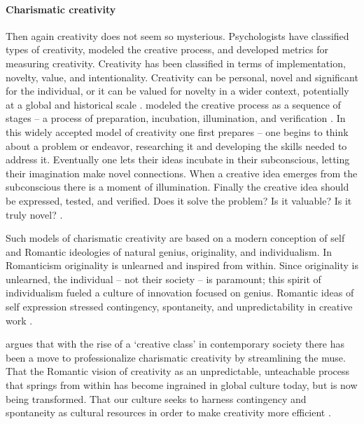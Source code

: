 \documentclass{article}
\begin{document}
\paragraph{Charismatic creativity}
Then again creativity does not seem so mysterious. %
%
Psychologists have classified types of creativity, modeled the creative process, 
and developed metrics for measuring creativity.
Creativity has been classified in terms of implementation, novelty, value, and intentionality. 
Creativity can be personal, novel and significant for the individual, or it can be valued for novelty in a wider context, potentially at a global and historical scale \citep{Drago2014}. 
%
\citeauthor{Wallas1926} modeled the creative process as a sequence of stages -- 
a process of preparation, incubation, illumination, and verification \citeyearpar{Wallas1926}. 
In this widely accepted model of creativity 
one first prepares -- 
one begins to think about a problem or endeavor, 
researching it and developing the skills needed to address it.
Eventually one lets their ideas incubate in their subconscious, 
letting their imagination make novel connections. 
When a creative idea emerges from the subconscious 
there is a moment of illumination.
Finally the creative idea should be expressed, tested, and verified.
Does it solve the problem? Is it valuable? Is it truly novel? \citep{Wallas1926, Drago2014}. 
%

Such models of charismatic creativity are based on a modern conception of self
and Romantic ideologies of natural genius, originality, and individualism. 
In Romanticism originality is unlearned and inspired from within. 
%
Since originality is unlearned, 
the individual -- not their society -- is paramount; 
this spirit of individualism 
fueled a culture of innovation focused on genius. 
%
Romantic ideas of self expression stressed 
contingency, spontaneity, and unpredictability
in creative work \citep{Wilf2013a,Wilf2013b}. 
%

%
\citeauthor{Wilf2013b}
argues that with the rise of a `creative class' in contemporary society 
there has been a move to professionalize charismatic creativity by streamlining the muse. 
That the Romantic vision of creativity as an unpredictable, unteachable process that springs from within 
has become ingrained in global culture today, but is now being transformed. 
That our culture seeks to harness contingency and spontaneity as cultural resources 
in order to make creativity more efficient \citeyearpar{Wilf2013b}. 
%
\end{document}
